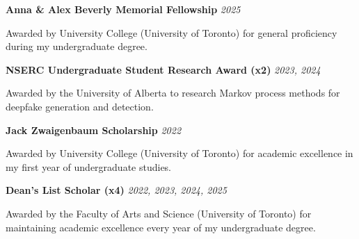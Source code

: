 \vspace*{10pt}
\noindent
\textbf{Anna \& Alex Beverly Memorial Fellowship}
\hfill \textit{2025}\par
\vspace{3pt}
\noindent
Awarded by University College (University of Toronto) for general
proficiency during my undergraduate degree.\par

\vspace{10pt}
\noindent
\textbf{NSERC Undergraduate Student Research Award (x2)}
\hfill \textit{2023, 2024}\par
\vspace{3pt}
\noindent
Awarded by the University of Alberta to research Markov process
methods for deepfake generation and detection.\par

\vspace{10pt}
\noindent
\textbf{Jack Zwaigenbaum Scholarship}
\hfill \textit{2022}\par
\vspace{3pt}
\noindent
Awarded by University College (University of Toronto) for academic
excellence in my first year of undergraduate studies.\par

\vspace{10pt}
\noindent
\textbf{Dean's List Scholar (x4)}
\hfill \textit{2022, 2023, 2024, 2025}\par
\vspace{3pt}
\noindent
Awarded by the Faculty of Arts and Science (University of Toronto)
for maintaining academic excellence every year of my
undergraduate degree.\par